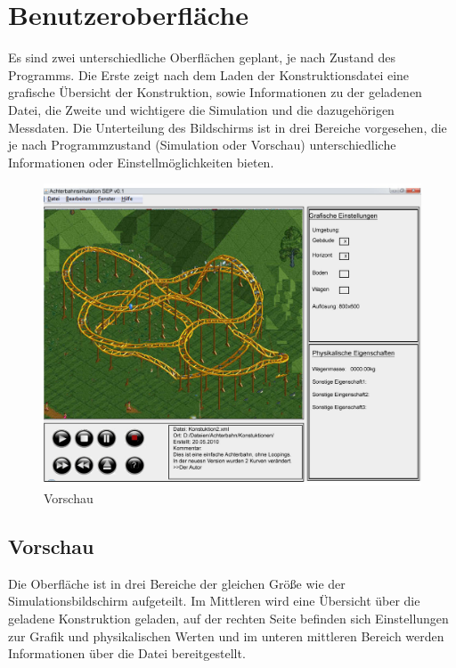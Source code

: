 
\chapter{Benutzeroberfläche}
Es sind zwei unterschiedliche Oberflächen geplant, je nach Zustand des Programms. Die Erste zeigt nach dem Laden der Konstruktionsdatei eine grafische Übersicht der Konstruktion, sowie Informationen zu der geladenen Datei, die Zweite und wichtigere die Simulation und die dazugehörigen Messdaten. Die Unterteilung des Bildschirms ist in drei Bereiche vorgesehen, die je nach Programmzustand (Simulation oder Vorschau) unterschiedliche Informationen oder Einstellmöglichkeiten bieten.




\begin{figure}[!h]%
\includegraphics[width=0.8\linewidth]{./bilder/GUI_v3.jpg}%
\caption{Vorschau}%
\label{Vorschau}%
\end{figure}

\section*{Vorschau}
Die Oberfläche ist in drei Bereiche der gleichen Größe wie der Simulationsbildschirm aufgeteilt. Im Mittleren wird eine Übersicht über die geladene Konstruktion geladen, auf der rechten Seite befinden sich Einstellungen zur Grafik und physikalischen Werten und im unteren mittleren Bereich werden Informationen über die Datei bereitgestellt.


